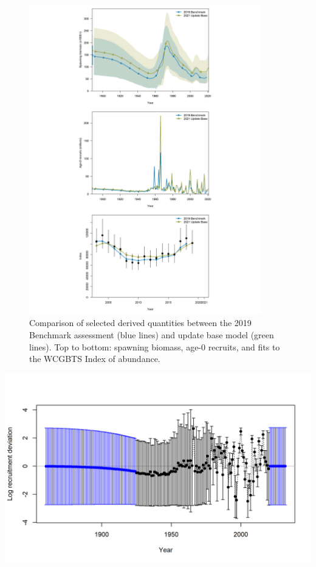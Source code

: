 \documentclass[11pt,
  english,
  a4paper,
]{article}
\begin{document}
\begin{figure}
\centering
\includegraphics[width=0.9\textwidth,height=0.9\textheight]{figs/base_panel.png}
\caption{Comparison of selected derived quantities between the 2019 Benchmark assessment (blue lines) and update base model (green lines). Top to bottom: spawning biomass, age-0 recruits, and fits to the WCGBTS Index of abundance. \label{fig:basepanel}}
\end{figure}

\tagmcend\tagstructend

\clearpage


\includegraphics[width=1\textwidth,height=1\textheight]{figs/recdevs2_withbars.png}
\end{document}

